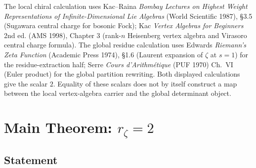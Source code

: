 \begin{remark}
\label{v4-arith:w9-r3:rem:disjoint-sources}
The local chiral calculation uses Kac--Raina \emph{Bombay Lectures on Highest
Weight Representations of Infinite-Dimensional Lie Algebras}
(World Scientific 1987), \S 3.5 (Sugawara central charge for
bosonic Fock); Kac \emph{Vertex Algebras for Beginners} 2nd ed.
(AMS 1998), Chapter 3 (rank-\(n\) Heisenberg vertex algebra and Virasoro
central charge formula).
The global residue calculation uses Edwards \emph{Riemann's Zeta Function}
(Academic Press 1974), \S 1.6 (Laurent expansion of \(\zeta\) at
\(s=1\)) for the residue-extraction half; Serre \emph{Cours
d'Arithm\'etique} (PUF 1970) Ch.~VI (Euler product) for the
global partition rewriting. Both displayed calculations give the
scalar \(2\). Equality of these scalars does not by itself
construct a map between the local vertex-algebra carrier and
the global determinant object.
\end{remark}

\section{Main Theorem: \(r_{\zeta}=2\)}
\label{v4-arith:w9-r3:main}

\subsection{Statement}
\label{v4-arith:w9-r3:main-statement}

